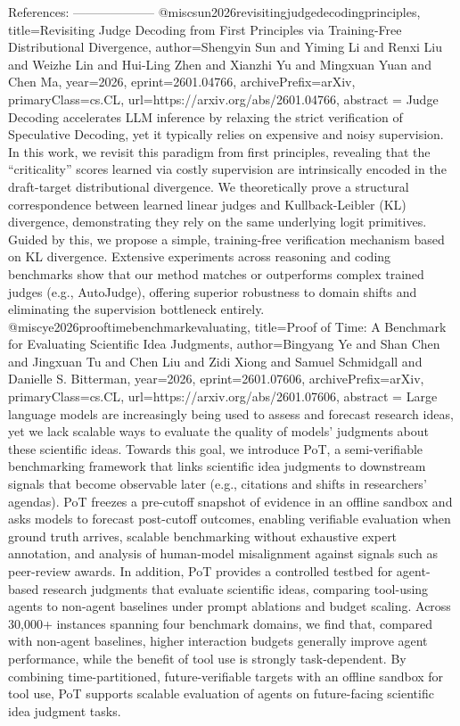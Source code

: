         References:
        --------------------
        @misc{sun2026revisitingjudgedecodingprinciples,
      title={Revisiting Judge Decoding from First Principles via Training-Free Distributional Divergence}, 
      author={Shengyin Sun and Yiming Li and Renxi Liu and Weizhe Lin and Hui-Ling Zhen and Xianzhi Yu and Mingxuan Yuan and Chen Ma},
      year={2026},
      eprint={2601.04766},
      archivePrefix={arXiv},
      primaryClass={cs.CL},
      url={https://arxiv.org/abs/2601.04766},
      abstract = {Judge Decoding accelerates LLM inference by relaxing the strict verification of Speculative Decoding, yet it typically relies on expensive and noisy supervision. In this work, we revisit this paradigm from first principles, revealing that the ``criticality'' scores learned via costly supervision are intrinsically encoded in the draft-target distributional divergence. We theoretically prove a structural correspondence between learned linear judges and Kullback-Leibler (KL) divergence, demonstrating they rely on the same underlying logit primitives. Guided by this, we propose a simple, training-free verification mechanism based on KL divergence. Extensive experiments across reasoning and coding benchmarks show that our method matches or outperforms complex trained judges (e.g., AutoJudge), offering superior robustness to domain shifts and eliminating the supervision bottleneck entirely.}
}@misc{ye2026prooftimebenchmarkevaluating,
      title={Proof of Time: A Benchmark for Evaluating Scientific Idea Judgments}, 
      author={Bingyang Ye and Shan Chen and Jingxuan Tu and Chen Liu and Zidi Xiong and Samuel Schmidgall and Danielle S. Bitterman},
      year={2026},
      eprint={2601.07606},
      archivePrefix={arXiv},
      primaryClass={cs.CL},
      url={https://arxiv.org/abs/2601.07606},
      abstract = {Large language models are increasingly being used to assess and forecast research ideas, yet we lack scalable ways to evaluate the quality of models' judgments about these scientific ideas. Towards this goal, we introduce PoT, a semi-verifiable benchmarking framework that links scientific idea judgments to downstream signals that become observable later (e.g., citations and shifts in researchers' agendas). PoT freezes a pre-cutoff snapshot of evidence in an offline sandbox and asks models to forecast post-cutoff outcomes, enabling verifiable evaluation when ground truth arrives, scalable benchmarking without exhaustive expert annotation, and analysis of human-model misalignment against signals such as peer-review awards. In addition, PoT provides a controlled testbed for agent-based research judgments that evaluate scientific ideas, comparing tool-using agents to non-agent baselines under prompt ablations and budget scaling. Across 30,000+ instances spanning four benchmark domains, we find that, compared with non-agent baselines, higher interaction budgets generally improve agent performance, while the benefit of tool use is strongly task-dependent. By combining time-partitioned, future-verifiable targets with an offline sandbox for tool use, PoT supports scalable evaluation of agents on future-facing scientific idea judgment tasks.}
}
